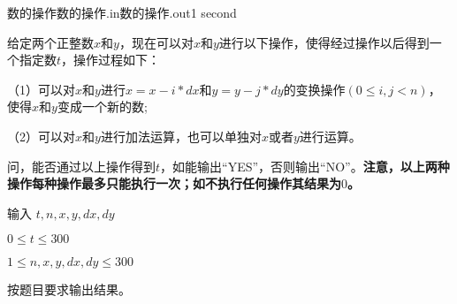 \begin{problem}{数的操作}{数的操作.in}{数的操作.out}{1 second}

给定两个正整数$x$和$y$，现在可以对$x$和$y$进行以下操作，使得经过操作以后得到一个指定数$t$，操作过程如下：

（1）可以对$x$和$y$进行$x=x-i*dx$和$y=y-j*dy$的变换操作$(0 \leq i,j<n)$，使得$x$和$y$变成一个新的数;

（2）可以对$x$和$y$进行加法运算，也可以单独对$x$或者$y$进行运算。

问，能否通过以上操作得到$t$，如能输出“YES”，否则输出“NO”。\textbf{注意，以上两种操作每种操作最多只能执行一次；如不执行任何操作其结果为$0$。}

\InputFile

输入 $t,n,x,y,dx,dy$

$0 \leq t \leq 300$

$1 \leq n,x,y,dx,dy \leq 300$

\OutputFile

按题目要求输出结果。

\Examples

\begin{example}
%
\end{example}
\end{problem}

